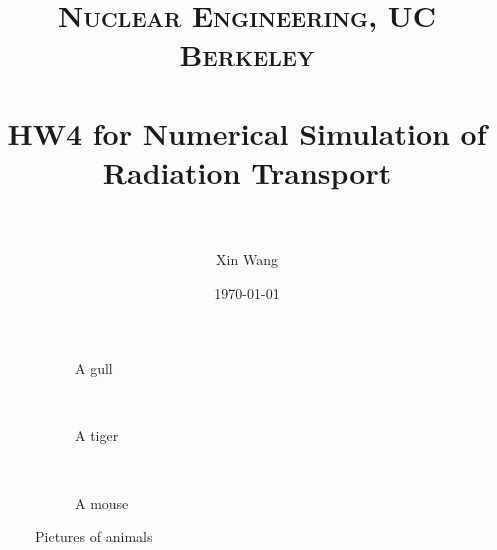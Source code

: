 \documentclass[paper=a4, fontsize=11pt]{article} %
\title{ 
\normalfont \normalsize 
\textsc{Nuclear Engineering, UC Berkeley} \\ [25pt] %
\horrule{0.5pt} \\[0.4cm] %
\huge HW4 for Numerical Simulation of Radiation Transport\\ %
\horrule{2pt} \\[0.5cm] %
}
\author{Xin Wang} %
\date{\normalsize\today} %
\newcommand{\ra}[1]{\renewcommand{\arraystretch}{#1}}
\begin{document}
\clearpage\maketitle
\thispagestyle{empty}

\clearpage\tableofcontents
\thispagestyle{empty}
\pagebreak

\setcounter{page}{1}

\begin{figure}
        \centering
        \begin{subfigure}[b]{0.3\textwidth}
                \caption{A gull}
                \label{fig:gull}
        \end{subfigure}%
        ~ %
        \begin{subfigure}[b]{0.3\textwidth}
                \caption{A tiger}
                \label{fig:tiger}
        \end{subfigure}
        ~ %
        \begin{subfigure}[b]{0.3\textwidth}
                \caption{A mouse}
                \label{fig:mouse}
        \end{subfigure}
        \caption{Pictures of animals}\label{fig:animals}
\end{figure}


\end{document}
